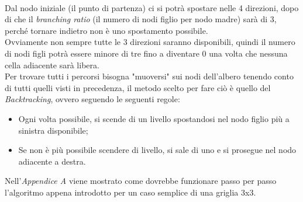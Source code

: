 \documentclass[11pt,a4paper,twocolumn]{IEEEtran}
\newcounter{algoritmo}
\begin{document}
	\vspace{-3cm}\\
   Dal nodo iniziale (il punto di partenza) ci si potrà spostare nelle 4 direzioni, dopo di che il \textit{branching ratio} (il numero di nodi figlio per nodo madre) sarà di 3, perché tornare indietro non è uno spostamento possibile.\\
   Ovviamente non sempre tutte le 3 direzioni saranno disponibili, quindi il numero di nodi figli potrà essere minore di tre fino a diventare 0 una volta che nessuna cella adiacente sarà libera.\\
   Per trovare tutti i percorsi bisogna "muoversi" sui nodi dell'albero tenendo conto di tutti quelli visti in precedenza, il metodo scelto per fare ciò è quello del \textit{Backtracking}, ovvero seguendo le seguenti regole:
   \begin{itemize}
   	\item Ogni volta possibile, si scende di un livello spostandosi nel nodo figlio più a sinistra disponibile;
   	\item Se non è più possibile scendere di livello, si sale di uno e si prosegue nel nodo adiacente a destra.
   \end{itemize}
	
	Nell'\textit{Appendice A} viene mostrato come dovrebbe funzionare passo per passo l'algoritmo appena introdotto per un caso semplice di una griglia 3x3.\medskip\\
	
\end{document}
